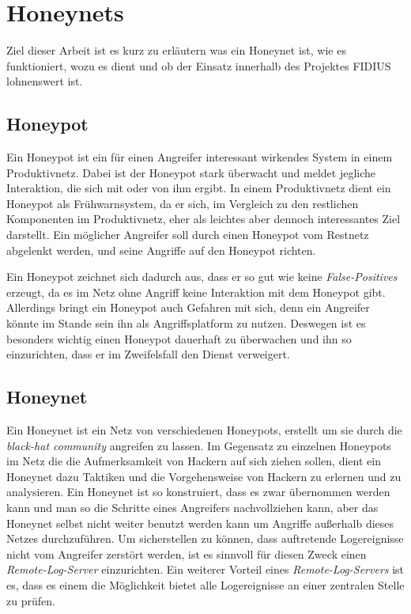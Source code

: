 \section{Honeynets}
\label{compositions:honeynets}
Ziel dieser Arbeit ist es kurz zu erläutern was
ein Honeynet ist, wie es funktioniert, wozu es dient und ob der
Einsatz innerhalb des Projektes FIDIUS lohnenswert ist.

\subsection{Honeypot} Ein Honeypot ist ein für einen Angreifer
interessant wirkendes System in einem Produktivnetz. Dabei ist der
Honeypot stark überwacht und meldet jegliche Interaktion, die sich mit
oder von ihm ergibt. In einem Produktivnetz dient ein Honeypot als
Frühwarnsystem, da er sich, im Vergleich zu den restlichen Komponenten
im Produktivnetz, eher als leichtes aber dennoch interessantes Ziel
darstellt. Ein möglicher Angreifer soll durch einen Honeypot vom
Restnetz abgelenkt werden, und seine Angriffe auf den Honeypot
richten.

Ein Honeypot zeichnet sich dadurch aus, dass er so gut wie keine
\textit{False-Positives} erzeugt, da es im Netz ohne Angriff keine
Interaktion mit dem Honeypot gibt. Allerdings bringt ein Honeypot auch
Gefahren mit sich, denn ein Angreifer könnte im Stande sein ihn als
Angriffsplatform zu nutzen.  Deswegen ist es besonders wichtig einen
Honeypot dauerhaft zu überwachen und ihn so einzurichten, dass er im
Zweifelsfall den Dienst verweigert.

\subsection{Honeynet} Ein Honeynet ist ein Netz von verschiedenen
Honeypots, erstellt um sie durch die \textit{black-hat community}
angreifen zu lassen. Im Gegensatz zu einzelnen Honeypots im Netz die
die Aufmerksamkeit von Hackern auf sich ziehen sollen, dient ein
Honeynet dazu Taktiken und die Vorgehensweise von Hackern zu erlernen
und zu analysieren.  Ein Honeynet ist so konstruiert, dass es zwar
übernommen werden kann und man so die Schritte eines Angreifers
nachvollziehen kann, aber das Honeynet selbst nicht weiter benutzt
werden kann um Angriffe außerhalb dieses Netzes durchzuführen.  Um
sicherstellen zu können, dass auftretende Logereignisse nicht vom
Angreifer zerstört werden, ist es sinnvoll für diesen Zweck einen
\textit{Remote-Log-Server} einzurichten. Ein weiterer Vorteil eines
\textit{Remote-Log-Servers} ist es, dass es einem die Möglichkeit
bietet alle Logereignisse an einer zentralen Stelle zu prüfen.

